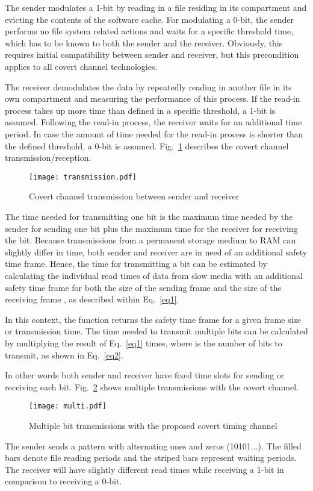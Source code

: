 \documentclass[runningheads,a4paper]{llncs}
\begin{document}
The sender modulates a 1-bit by reading in a file residing in its compartment and evicting the contents of the software cache.
For modulating a 0-bit, the sender performs no file system related actions and waits for a specific threshold time, which has to be known to both the sender and the receiver.
Obviously, this requires initial compatibility between sender and receiver, but this precondition applies to all covert channel technologies.

The receiver demodulates the data by repeatedly reading in another file in its own compartment and measuring the performance of this process.
If the read-in process takes up more time than defined in a specific threshold, a 1-bit is assumed.
Following the read-in process, the receiver waits for an additional time period.
In case the amount of time needed for the read-in process is shorter than the defined threshold, a 0-bit is assumed.
Fig.~\ref{transmission} describes the covert channel transmission/reception.

\begin{figure}[!ht]
\texttt{[image: transmission.pdf]}
\caption{Covert channel transmission between sender and receiver}
\label{transmission}
\end{figure}

The time needed for transmitting one bit is the maximum time needed by the sender for sending one bit plus the maximum time for the receiver for receiving the bit. 
Because transmissions from a permanent storage medium to RAM can slightly differ in time, both sender and receiver are in need of an additional safety time frame. 
Hence, the time  for transmitting a bit  can be estimated by calculating the individual read times of data from slow media with an additional safety time frame  for both the size of the sending frame  and the size of the receiving frame , as described within Eq.~\ref{eq1}.



In this context, the function  returns the safety time frame for a given frame size or transmission time.
The time needed to transmit multiple bits can be calculated by multiplying the result of Eq.~\ref{eq1}  times, where  is the number of bits to transmit, as shown in Eq.~\ref{eq2}.



In other words both sender and receiver have fixed time slots for sending or receiving each bit.
Fig.~\ref{multi} shows multiple transmissions with the covert channel.
\begin{figure}[!ht]
\texttt{[image: multi.pdf]}
\caption{Multiple bit transmissions with the proposed covert timing channel}
\label{multi}
\end{figure}
The sender sends a pattern with alternating ones and zeros (10101...).
The filled bars denote file reading periods and the striped bars represent waiting periods.
The receiver will have slightly different read times while receiving a 1-bit in comparison to receiving a 0-bit.
\end{document}
